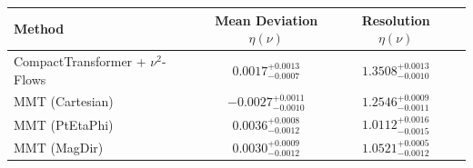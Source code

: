     \begin{tabular}{lccc}
        \toprule
        Method & Mean Deviation $\eta({\nu})$ & Resolution $\eta({\nu})$ \\
        \midrule
        CompactTransformer + $\nu^2$-Flows & $0.0017^{+0.0013}_{-0.0007}$ & $1.3508^{+0.0013}_{-0.0010}$ \\
        MMT (Cartesian) & $-0.0027^{+0.0011}_{-0.0010}$ & $1.2546^{+0.0009}_{-0.0011}$ \\
        MMT (PtEtaPhi) & $0.0036^{+0.0008}_{-0.0012}$ & $1.0112^{+0.0016}_{-0.0015}$ \\
        MMT (MagDir) & $0.0030^{+0.0009}_{-0.0012}$ & $1.0521^{+0.0005}_{-0.0012}$ \\
        \bottomrule
    \end{tabular}